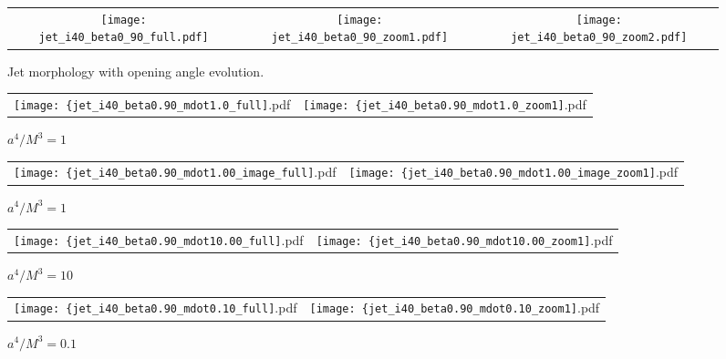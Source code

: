 \begin{figure*}
\begin{center}
  \begin{tabular}{ccc}
    \texttt{[image: jet\_i40\_beta0\_90\_full.pdf]} &
    \texttt{[image: jet\_i40\_beta0\_90\_zoom1.pdf]} &
    \texttt{[image: jet\_i40\_beta0\_90\_zoom2.pdf]}
  \end{tabular}
\end{center}
\caption{Jet morphology with opening angle evolution.}
\label{fig:jet_psi}
\end{figure*}

\begin{figure*}
\begin{center}
  \begin{tabular}{cc}
    \texttt{[image: \{jet\_i40\_beta0.90\_mdot1.0\_full]}.pdf} &
    \texttt{[image: \{jet\_i40\_beta0.90\_mdot1.0\_zoom1]}.pdf} 
  \end{tabular}
\end{center}
\caption{$a^4/M^3=1$}
\label{fig:jet_mdot1.0}
\end{figure*}

\begin{figure*}
\begin{center}
  \begin{tabular}{cc}
    \texttt{[image: \{jet\_i40\_beta0.90\_mdot1.00\_image\_full]}.pdf} &
    \texttt{[image: \{jet\_i40\_beta0.90\_mdot1.00\_image\_zoom1]}.pdf} 
  \end{tabular}
\end{center}
\caption{$a^4/M^3=1$}
\label{fig:jet_mdot1.0_image}
\end{figure*}


\begin{figure*}
\begin{center}
  \begin{tabular}{cc}
    \texttt{[image: \{jet\_i40\_beta0.90\_mdot10.00\_full]}.pdf} &
    \texttt{[image: \{jet\_i40\_beta0.90\_mdot10.00\_zoom1]}.pdf} 
  \end{tabular}
\end{center}
\caption{$a^4/M^3=10$}
\label{fig:jet_10.0}
\end{figure*}

\begin{figure*}
  \begin{center}
    \begin{tabular}{cc}
      \texttt{[image: \{jet\_i40\_beta0.90\_mdot0.10\_full]}.pdf} &
      \texttt{[image: \{jet\_i40\_beta0.90\_mdot0.10\_zoom1]}.pdf} 
    \end{tabular}
  \end{center}
  \caption{$a^4/M^3=0.1$}
  \label{fig:jet_mdot0.1}
\end{figure*}

